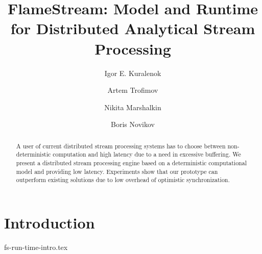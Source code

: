\documentclass{llncs}
\newcommand {\FlameStream} {FlameStream}
\begin{document}
\title {\FlameStream: Model and Runtime for Distributed Analytical Stream Processing}
\author{Igor E. Kuralenok \and Artem Trofimov \and Nikita Marshalkin \and Boris Novikov}

\maketitle
{}

\begin{abstract}
A user of current distributed stream processing systems has to choose between non-deterministic computation and high latency due to a need in excessive buffering. 
We present a distributed stream processing engine based on a deterministic computational model and providing low latency. 
Experiments show that our prototype can outperform existing solutions due to low overhead of optimistic synchronization.


\end {abstract}

\section {Introduction}
 {fs-run-time-intro.tex}
\end{document}
